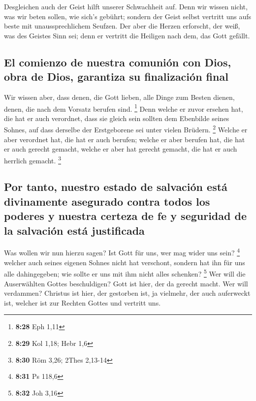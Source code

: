  Desgleichen auch der Geist hilft unserer Schwachheit
auf. Denn wir wissen nicht, was wir beten sollen, wie sich's gebührt;
sondern der Geist selbst vertritt uns aufs beste mit unaussprechlichem
Seufzen.  Der aber die Herzen erforscht, der weiß, was
des Geistes Sinn sei; denn er vertritt die Heiligen nach dem, das Gott
gefällt.

\hypertarget{el-comienzo-de-nuestra-comuniuxf3n-con-dios-obra-de-dios-garantiza-su-finalizaciuxf3n-final}{%
\subsection{El comienzo de nuestra comunión con Dios, obra de Dios,
garantiza su finalización
final}\label{el-comienzo-de-nuestra-comuniuxf3n-con-dios-obra-de-dios-garantiza-su-finalizaciuxf3n-final}}

 Wir wissen aber, dass denen, die Gott lieben, alle Dinge
zum Besten dienen, denen, die nach dem Vorsatz berufen sind. \footnote{\textbf{8:28}
  Eph 1,11}  Denn welche er zuvor ersehen hat, die hat er
auch verordnet, dass sie gleich sein sollten dem Ebenbilde seines
Sohnes, auf dass derselbe der Erstgeborene sei unter vielen Brüdern.
\footnote{\textbf{8:29} Kol 1,18; Hebr 1,6}  Welche er
aber verordnet hat, die hat er auch berufen; welche er aber berufen hat,
die hat er auch gerecht gemacht, welche er aber hat gerecht gemacht, die
hat er auch herrlich gemacht. \footnote{\textbf{8:30} Röm 3,26; 2Thes
  2,13-14}

\hypertarget{por-tanto-nuestro-estado-de-salvaciuxf3n-estuxe1-divinamente-asegurado-contra-todos-los-poderes-y-nuestra-certeza-de-fe-y-seguridad-de-la-salvaciuxf3n-estuxe1-justificada}{%
\subsection{Por tanto, nuestro estado de salvación está divinamente
asegurado contra todos los poderes y nuestra certeza de fe y seguridad
de la salvación está
justificada}\label{por-tanto-nuestro-estado-de-salvaciuxf3n-estuxe1-divinamente-asegurado-contra-todos-los-poderes-y-nuestra-certeza-de-fe-y-seguridad-de-la-salvaciuxf3n-estuxe1-justificada}}

 Was wollen wir nun hierzu sagen? Ist Gott für uns, wer
mag wider uns sein? \footnote{\textbf{8:31} Ps 118,6} 
welcher auch seines eigenen Sohnes nicht hat verschont, sondern hat ihn
für uns alle dahingegeben; wie sollte er uns mit ihm nicht alles
schenken? \footnote{\textbf{8:32} Joh 3,16}  Wer will die
Auserwählten Gottes beschuldigen? Gott ist hier, der da gerecht macht.
 Wer will verdammen? Christus ist hier, der gestorben
ist, ja vielmehr, der auch auferweckt ist, welcher ist zur Rechten
Gottes und vertritt uns.

